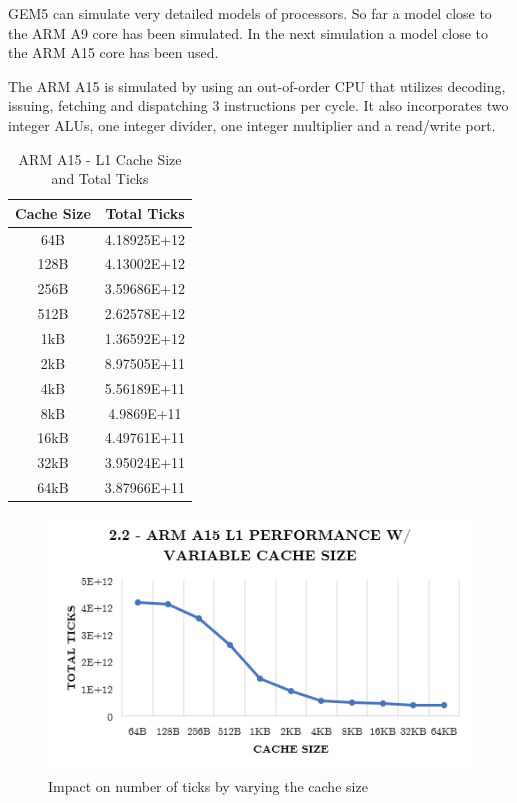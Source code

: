 \documentclass[a4paper, 10pt, conference]{ieeeconf}      %
\begin{document}
GEM5 can simulate very detailed models of processors. So far a model close to the ARM A9 core has been simulated. In the next simulation a model close to the ARM A15 core has been used.

The ARM A15 is simulated by using an out-of-order CPU that utilizes decoding, issuing, fetching and dispatching 3 instructions per cycle. It also incorporates two integer ALUs, one integer divider, one integer multiplier and a read/write port.

\begin{table}[h]
\caption{ARM A15 - L1 Cache Size and Total Ticks}
\label{table_example}
\begin{center}
\begin{tabular}{|c||c|}
\hline
Cache Size & Total Ticks\\
\hline
64B & 4.18925E+12
\\
\hline
128B & 4.13002E+12
\\
\hline
256B & 3.59686E+12
\\
\hline
512B & 2.62578E+12
\\
\hline
1kB & 1.36592E+12
\\
\hline
2kB & 8.97505E+11
\\
\hline
4kB & 5.56189E+11
\\
\hline
8kB & 4.9869E+11
\\
\hline
16kB & 4.49761E+11
\\
\hline
32kB & 3.95024E+11
\\
\hline
64kB & 3.87966E+11
\\
\hline

\end{tabular}
\end{center}
\end{table}

\begin{figure}[thpb]
\centering
\includegraphics[scale=.5]{ex2_2.png}
\caption{Impact on number of ticks by varying the cache size}
\label{figure2_2}
\end{figure}
\end{document}
